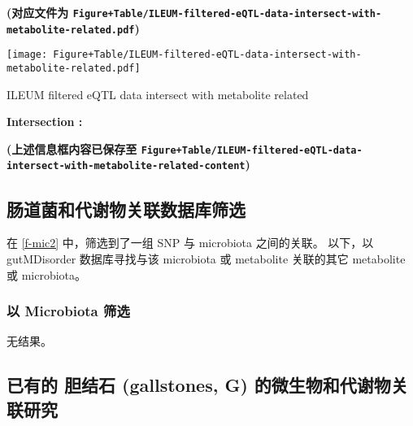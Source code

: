 \documentclass[
]{article}
\begin{document}
\textbf{(对应文件为 \texttt{Figure+Table/ILEUM-filtered-eQTL-data-intersect-with-metabolite-related.pdf})}

\def\@captype{figure}
\begin{center}
\texttt{[image: Figure+Table/ILEUM-filtered-eQTL-data-intersect-with-metabolite-related.pdf]}
\caption{ILEUM filtered eQTL data intersect with metabolite related}\label{fig:ILEUM-filtered-eQTL-data-intersect-with-metabolite-related}
\end{center}
\begin{center}\begin{tcolorbox}[colback=gray!10, colframe=gray!50, width=0.9\linewidth, arc=1mm, boxrule=0.5pt]
\textbf{
Intersection
:}

\vspace{0.5em}



\vspace{2em}
\end{tcolorbox}
\end{center}

\textbf{(上述信息框内容已保存至 \texttt{Figure+Table/ILEUM-filtered-eQTL-data-intersect-with-metabolite-related-content})}

\hypertarget{ux80a0ux9053ux83ccux548cux4ee3ux8c22ux7269ux5173ux8054ux6570ux636eux5e93ux7b5bux9009-1}{%
\subsection{肠道菌和代谢物关联数据库筛选}\label{ux80a0ux9053ux83ccux548cux4ee3ux8c22ux7269ux5173ux8054ux6570ux636eux5e93ux7b5bux9009-1}}

在 \ref{f-mic2} 中，筛选到了一组 SNP 与 microbiota 之间的关联。
以下，以 gutMDisorder 数据库寻找与该 microbiota 或 metabolite 关联的其它 metabolite 或 microbiota。

\hypertarget{ux4ee5-microbiota-ux7b5bux9009-1}{%
\subsubsection{以 Microbiota 筛选}\label{ux4ee5-microbiota-ux7b5bux9009-1}}

无结果。

\hypertarget{ux5df2ux6709ux7684-ux80c6ux7ed3ux77f3-gallstones-g-ux7684ux5faeux751fux7269ux548cux4ee3ux8c22ux7269ux5173ux8054ux7814ux7a76-1}{%
\subsection{已有的 胆结石 (gallstones, G) 的微生物和代谢物关联研究}\label{ux5df2ux6709ux7684-ux80c6ux7ed3ux77f3-gallstones-g-ux7684ux5faeux751fux7269ux548cux4ee3ux8c22ux7269ux5173ux8054ux7814ux7a76-1}}
\end{document}
